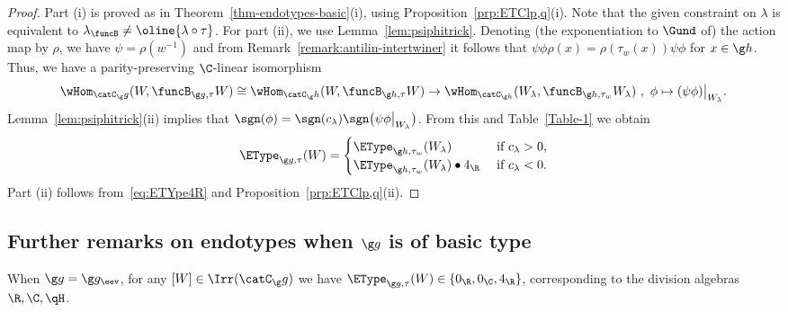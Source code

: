 \documentclass[12pt]{amsart}
\begin{document}
\begin{proof}
Part (i) is proved as in Theorem~\ref{thm-endotypes-basic}(i), using Proposition~\ref{prp:ETClp,q}(i). Note that the given constraint on $\lambda$ is equivalent to $\lambda_\funcB\neq\oline{\lambda\circ\tau}$.  For part (ii), we use Lemma~\ref{lem:psiphitrick}. Denoting (the exponentiation to $\Gund$ of) the action map  by $\rho$, we have $\psi=\rho(w^{-1})$ and from Remark~\ref{remark:antilin-intertwiner} it follows that 
$\psi\phi\rho(x)=\rho(\tau_w(x))\psi\phi$  for $x\in\g h$. Thus, 
we have a parity-preserving $\C$-linear isomorphism
\[
\wHom_{\catC_\g g}(W,\funcB_{\g g,\tau}W)
\cong \wHom_{\catC_\g h}(W,\funcB_{\g h,\tau}W)\to 
\wHom_{\catC_{\g h}}(W_\lambda,\funcB_{\g h,\tau_w}W_\lambda)
\ ,\ 
\phi\mapsto (\psi\phi)\big|_{W_\lambda}.
\]  
Lemma~\ref{lem:psiphitrick}(ii) implies that 
$
\sgn(\phi)=\sgn(c_\lambda)\sgn\big(\psi\phi\big|_{W_\lambda}\big)$. 
From this and Table~\ref{Table-1} we obtain
\begin{equation}
\label{eq:ETYpe4R}
\EType_{\g g,\tau}(W)=\begin{cases}
\EType_{\g h,\tau_w}(W_\lambda)&\text{ if }c_\lambda>0,\\
\EType_{\g h,\tau_w}(W_\lambda)\bullet 4_\R&\text{ if }c_\lambda<0.\\
\end{cases}
\end{equation}
Part (ii) follows from~\eqref{eq:ETYpe4R} and Proposition~\ref{prp:ETClp,q}(ii).
\end{proof}

\subsection{Further remarks on endotypes when  $\g g$ is of basic type}
When  $\g g=\g g_\eev$, for any $[W]\in\Irr(\catC_\g g)$ we have  
$\EType_{\g g,\tau}(W)\in\{0_\R,0_\C,4_\R\}$, corresponding to the division algebras $\R,\C,\qH$. 
\end{document}

